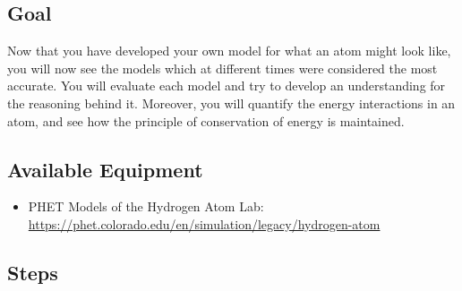 \subsection{Goal} 
Now that you have developed your own model for what an atom might look like, you will now see the models which at different times were considered the most accurate. You will evaluate each model and try to develop an understanding for the reasoning behind it. Moreover, you will quantify the energy interactions in an atom, and see how the principle of conservation of energy is maintained. 

\subsection{Available Equipment}

\begin{itemize}
	\item PHET Models of the Hydrogen Atom Lab: \url{https://phet.colorado.edu/en/simulation/legacy/hydrogen-atom}
\end{itemize}

\subsection{Steps}

